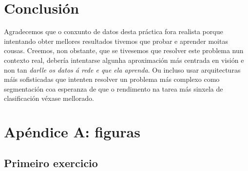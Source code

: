 \documentclass{article}
\begin{document}
\section{Conclusión}

Agradecemos que o conxunto de datos desta práctica fora realista porque intentando obter mellores resultados tivemos que probar e aprender moitas cousas. Creemos, non obstante, que se tivesemos que resolver este problema nun contexto real, debería intentarse algunha aproximación más centrada en visión e non tan \emph{darlle os datos á rede e que ela aprenda}. Ou incluso usar arquitecturas máis sofisticadas que intenten resolver un problema más complexo como segmentación coa esperanza de que o rendimento na tarea más sinxela de clasificación véxase mellorado.

\newpage

\section{Apéndice A: figuras}
\subsection{Primeiro exercicio}
\end{document}
